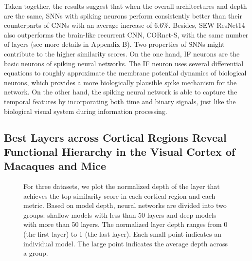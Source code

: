 \documentclass[letterpaper]{article} %
\begin{document}
Taken together, the results suggest that when the overall architectures and depth are the same, SNNs with spiking neurons perform consistently better than their counterparts of CNNs with an average increase of $6.6\%$. Besides, SEW ResNet14 also outperforms the brain-like recurrent CNN, CORnet-S, with the same number of layers (see more details in Appendix B). Two properties of SNNs might contribute to the higher similarity scores. On the one hand, IF neurons are the basic neurons of spiking neural networks. The IF neuron uses several differential equations to roughly approximate the membrane potential dynamics of biological neurons, which provides a more biologically plausible spike mechanism for the network. On the other hand, the spiking neural network is able to capture the temporal features by incorporating both time and binary signals, just like the biological visual system during information processing.

\subsection{Best Layers across Cortical Regions Reveal Functional Hierarchy in the Visual Cortex of Macaques and Mice}

\begin{figure}[t]
	\centering
	\caption{For three datasets, we plot the normalized depth of the layer that achieves the top similarity score in each cortical region and each metric. Based on model depth, neural networks are divided into two groups: shallow models with less than 50 layers and deep models with more than 50 layers. The normalized layer depth ranges from 0 (the first layer) to 1 (the last layer). Each small point indicates an individual model. The large point indicates the average depth across a group.}
	\label{Fig.best_layer}
\end{figure}
\end{document}
